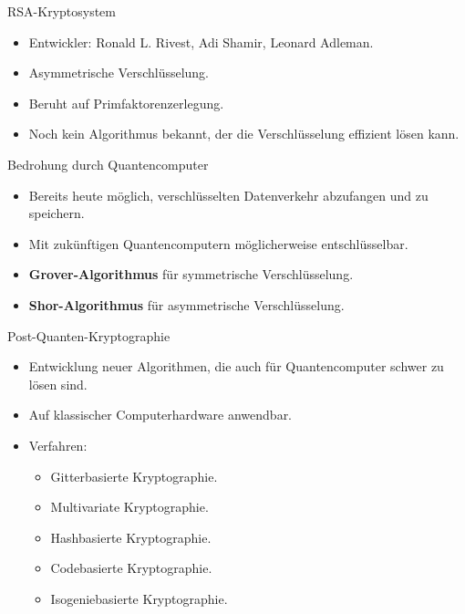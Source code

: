 \documentclass{beamer}
\begin{document}
    \begin{frame}{RSA-Kryptosystem}
        \begin{itemize}
            \item Entwickler: Ronald L. Rivest, Adi Shamir, Leonard Adleman.
            \item Asymmetrische Verschlüsselung.
            \item Beruht auf Primfaktorenzerlegung.
            \item Noch kein Algorithmus bekannt, der die Verschlüsselung effizient lösen kann.
        \end{itemize}
    \end{frame}

    \begin{frame}{Bedrohung durch Quantencomputer}
        \begin{itemize}
            \item Bereits heute möglich, verschlüsselten Datenverkehr abzufangen und zu speichern.
            \item Mit zukünftigen Quantencomputern möglicherweise entschlüsselbar.
            \item \textbf{Grover-Algorithmus} für symmetrische Verschlüsselung.
            \item \textbf{Shor-Algorithmus} für asymmetrische Verschlüsselung.
        \end{itemize}
    \end{frame}

    \begin{frame}{Post-Quanten-Kryptographie}
        \begin{itemize}
            \item Entwicklung neuer Algorithmen, die auch für Quantencomputer schwer zu lösen sind.
            \item Auf klassischer Computerhardware anwendbar.
            \item Verfahren:
            \begin{itemize}
                \item Gitterbasierte Kryptographie.
                \item Multivariate Kryptographie.
                \item Hashbasierte Kryptographie.
                \item Codebasierte Kryptographie.
                \item Isogeniebasierte Kryptographie.
            \end{itemize}
        \end{itemize}
    \end{frame}
\end{document}

